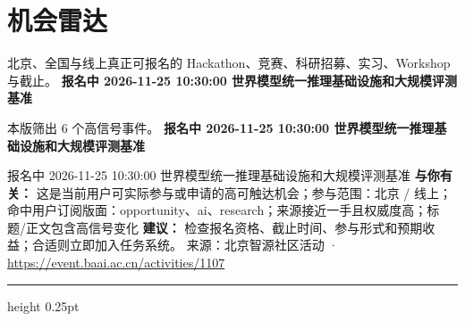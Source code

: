 \documentclass[10.5pt]{ctexart}
\begin{document}
\section*{机会雷达}
{\color{ormuted} 北京、全国与线上真正可报名的 Hackathon、竞赛、科研招募、实习、Workshop 与截止。}
\vspace{2mm}
{\LARGE\bfseries 报名中 2026-11-25 10:30:00 世界模型统一推理基础设施和大规模评测基准}\par
\vspace{1mm}
{\color{ormuted} 本版筛出 6 个高信号事件。}
\vspace{3mm}
{\Large\bfseries 报名中 2026-11-25 10:30:00 世界模型统一推理基础设施和大规模评测基准}\par
报名中 2026-11-25 10:30:00 世界模型统一推理基础设施和大规模评测基准
\textbf{与你有关：} 这是当前用户可实际参与或申请的高可触达机会；参与范围：北京 / 线上；命中用户订阅版面：opportunity、ai、research；来源接近一手且权威度高；标题/正文包含高信号变化
\textbf{建议：} 检查报名资格、截止时间、参与形式和预期收益；合适则立即加入任务系统。
{\footnotesize\color{ormuted} 来源：北京智源社区活动 · \url{https://event.baai.ac.cn/activities/1107}}
\vspace{4mm}
\hrule height 0.25pt
\vspace{3mm}
\end{document}
